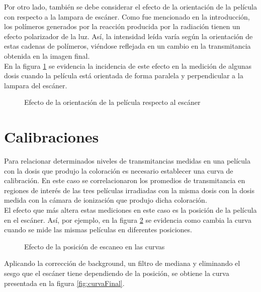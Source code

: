 Por otro lado, también se debe considerar el efecto de la orientación de la película con respecto a la lampara de escáner. Como fue mencionado en la introducción, los polímeros generados por la reacción producida por la radiación tienen un efecto polarizador de la luz. Así, la intensidad leída varía según la orientación de estas cadenas de polímeros, viéndose reflejada en un cambio en la transmitancia obtenida en la imagen final.\\

En la figura \ref{fig:efectoOrientacion} se evidencia la incidencia de este efecto en la  medición de algunas dosis cuando la película está orientada de forma paralela y perpendicular a la lampara del escáner. \\

\begin{figure}
	\centering
	
	\caption{Efecto de la orientación de la película respecto al escáner }
	\label{fig:efectoOrientacion}
\end{figure}


\section{Calibraciones}

Para relacionar determinados niveles de transmitancias medidas en una película con la dosis que produjo la coloración es necesario establecer una curva de calibración. En este caso se correlacionaron los promedios de transmitancia en regiones de interés de las tres películas irradiadas con la misma dosis con la dosis medida con la cámara de ionización que produjo dicha coloración.\\

El efecto que más altera estas mediciones en este caso es la posición de la película en el escáner. Así, por ejemplo, en la figura \ref{fig:curvasDezplazadas} se evidencia como cambia la curva cuando se mide las mismas películas en diferentes posiciones.\\
   
\begin{figure}
	\centering
	
	\caption{Efecto de la posición de escaneo en las curvas }
	\label{fig:curvasDezplazadas}
\end{figure}

Aplicando la corrección de background, un filtro de mediana y eliminando el sesgo que el escáner tiene dependiendo de la posición, se obtiene la curva presentada en la figura \ref{fig:curvaFinal}.\\

